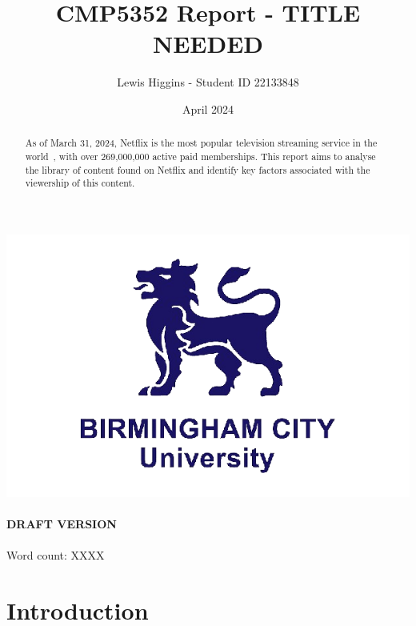 \documentclass[12pt]{report}\usepackage[]{graphicx}\usepackage[]{xcolor}
\title{CMP5352 Report - TITLE NEEDED}
\author{Lewis Higgins - Student ID 22133848}
\date{April 2024}
\begin{document}
 \pagecolor{yellow} %



    \makeatletter
    \begin{titlepage}
        \begin{center}
            \includegraphics[width=0.7\linewidth]{bcu logo}\\[4ex]
            {\large \bfseries  \@title }\\[2ex]
            {\large \bfseries  DRAFT VERSION }\\[2ex]
            {\@author}\\[30ex]
            {Word count: XXXX}\\[20ex]
        \end{center}
    \end{titlepage}
    \makeatother
    \thispagestyle{empty}
    \newpage

  \pagecolor{white} %

    \begin{abstract}

    As of March 31, 2024, Netflix is the most popular television streaming service
    in the world~\autocite{NetflixSubStats}, with over 269,000,000 active paid memberships. 
    This report aims to analyse the library of content found on Netflix and identify 
    key factors associated with the viewership of this content.

    \end{abstract} 
    
    \setcounter{page}{0}

    \tableofcontents
    \thispagestyle{empty}

    \chapter*{Introduction}
    
\end{document}
